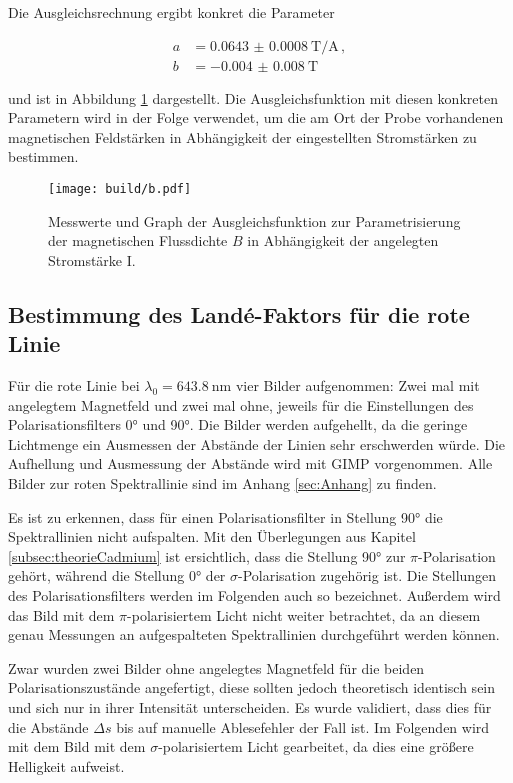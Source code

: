 Die Ausgleichsrechnung ergibt konkret die Parameter

\begin{align}
  a &= \SI{0.0643(8)}{\tesla\per\ampere}\,,\\
  b &= \SI{-0.004(8)}{\tesla}\,
  \label{eqn:paramsB(I)}
\end{align}

und ist in Abbildung \ref{fig:bAusgleich} dargestellt.
Die Ausgleichsfunktion mit diesen konkreten Parametern wird in der Folge verwendet, um
die am Ort der Probe vorhandenen magnetischen Feldstärken in Abhängigkeit der eingestellten Stromstärken zu bestimmen.

\begin{figure}
  \centering
  \texttt{[image: build/b.pdf]}
  \caption{Messwerte und Graph der Ausgleichsfunktion zur Parametrisierung der magnetischen Flussdichte $B$ in Abhängigkeit der angelegten Stromstärke I.}
  \label{fig:bAusgleich}
\end{figure}

\subsection{Bestimmung des Landé-Faktors für die rote Linie}

Für die rote Linie bei $\lambda_0=\SI{643.8}{\nano\meter}$ vier Bilder aufgenommen: Zwei mal mit angelegtem Magnetfeld und zwei mal ohne, jeweils für die Einstellungen des Polarisationsfilters \ang{0} und \ang{90}.
Die Bilder werden aufgehellt, da die geringe Lichtmenge ein Ausmessen der Abstände der Linien sehr erschwerden würde. Die Aufhellung und Ausmessung der Abstände wird mit GIMP \cite{gimp} vorgenommen.
Alle Bilder zur roten Spektrallinie sind im Anhang \ref{sec:Anhang} zu finden.

Es ist zu erkennen, dass für einen Polarisationsfilter in Stellung \ang{90} die Spektrallinien nicht aufspalten. Mit den Überlegungen aus Kapitel \ref{subsec:theorieCadmium} ist ersichtlich, dass die Stellung \ang{90} zur $\pi$-Polarisation gehört, während die Stellung \ang{0} der $\sigma$-Polarisation zugehörig ist. Die Stellungen des Polarisationsfilters werden im Folgenden auch so bezeichnet. Außerdem wird das Bild mit dem $\pi$-polarisiertem Licht nicht weiter betrachtet, da an diesem genau Messungen an aufgespalteten Spektrallinien durchgeführt werden können.

Zwar wurden zwei Bilder ohne angelegtes Magnetfeld für die beiden Polarisationszustände angefertigt, diese sollten jedoch theoretisch identisch sein und sich nur in ihrer Intensität unterscheiden. Es wurde validiert, dass dies für die Abstände $\Delta s$ bis auf manuelle Ablesefehler der Fall ist.
Im Folgenden wird mit dem Bild mit dem $\sigma$-polarisiertem Licht gearbeitet, da dies eine größere Helligkeit aufweist.

